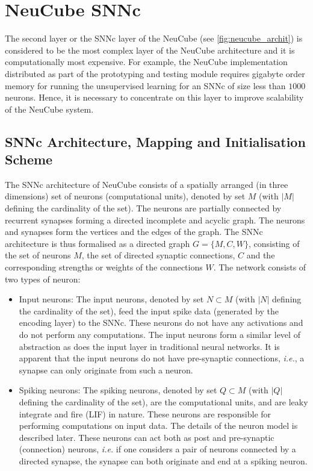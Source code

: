 \section{NeuCube SNNc}
The second layer or the SNNc layer of the NeuCube (see \figurename \ref{fig:neucube_archit}) is considered to be the most complex layer of the NeuCube architecture and it is computationally most expensive. For example, the NeuCube implementation distributed as part of the prototyping and testing module requires gigabyte order memory for running the unsupervised learning for an SNNc of size less than $1000$ neurons. Hence, it is necessary to concentrate on this layer to improve scalability of the NeuCube system. 

\subsection{SNNc Architecture, Mapping and Initialisation Scheme}
\label{subsec:SNNc_init}
The SNNc architecture of NeuCube consists of a spatially arranged (in three dimensions) set of neurons (computational units), denoted by set $M$ (with $|M|$ defining the cardinality of the set). The neurons are partially connected by recurrent synapses forming a directed incomplete and acyclic graph. The neurons and synapses form the vertices and the edges of the graph. The SNNc architecture is thus formalised as a directed graph $G=\{M, C, W\}$, consisting of the set of neurons $M$, the set of directed synaptic connections, $C$ and the corresponding strengths or weights of the connections $W$. The network consists of two types of neuron: 
\begin{itemize}
	\item Input neurons: The input neurons, denoted by set $N\subset M$ (with $|N|$ defining the cardinality of the set), feed the input spike data (generated by the encoding layer) to the SNNc. These neurons do not have any activations and do not perform any computations. The input neurons form a similar level of abstraction as does the input layer in traditional neural networks. It is apparent that the input neurons do not have pre-synaptic connections, \emph{i.e.}, a synapse can only originate from such a neuron.  
	\item Spiking neurons: The spiking neurons, denoted by set $Q\subset M$ (with $|Q|$ defining the cardinality of the set), are the computational units, and are leaky integrate and fire (LIF) in nature. These neurons are responsible for performing computations on input data. The details of the neuron model is described later. These neurons can act both as post and pre-synaptic (connection) neurons, \emph{i.e.} if one considers a pair of neurons connected by a directed synapse, the synapse can both originate and end at a spiking neuron.
\end{itemize} 
